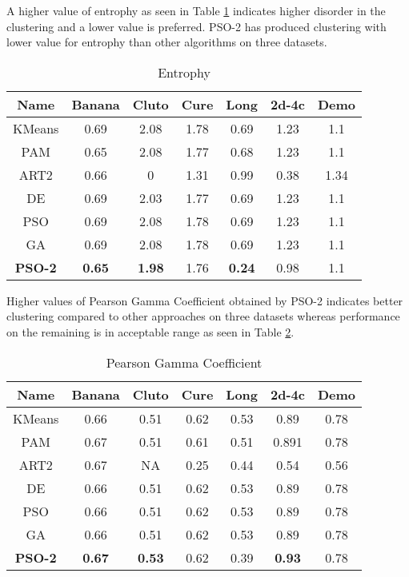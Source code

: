 \documentclass[conference]{IEEEtran}
\begin{document}
A higher value of entrophy as seen in Table \ref{ent} indicates higher disorder in the clustering and a lower value is preferred. PSO-2 has produced clustering with lower value for entrophy than other algorithms on three datasets.

\begin{table}[H]
\caption{Entrophy}
\label{ent}
\centering
\begin{tabular}{||c|c|c|c|c|c|c||}
  \hline
\multicolumn{1}{|c|}{\textbf{Name}} & \multicolumn{1}{c|}{\textbf{Banana}} & \multicolumn{1}{c|}{\textbf{Cluto}} & \multicolumn{1}{c|}{\textbf{Cure}} & \multicolumn{1}{c|}{\textbf{Long}} & \multicolumn{1}{c|}{\textbf{2d-4c}} & \multicolumn{1}{c|}{\textbf{Demo}}\\
  \hline\hline
  KMeans & 0.69 & 2.08 & 1.78 & 0.69 & 1.23 & 1.1 \\ [0.5ex]
   \hline
  PAM & 0.65 & 2.08 & 1.77 & 0.68 & 1.23 & 1.1 \\
   \hline
  ART2 & 0.66 & 0 & 1.31 & 0.99 & 0.38 & 1.34 \\
   \hline
  DE & 0.69 & 2.03 & 1.77 & 0.69 & 1.23 & 1.1 \\
   \hline
  PSO & 0.69 & 2.08 & 1.78 & 0.69 & 1.23 & 1.1 \\
   \hline
  GA & 0.69 & 2.08 & 1.78 & 0.69 & 1.23 & 1.1 \\
   \hline
  \textbf{PSO-2} & \textbf{0.65} & \textbf{1.98} & 1.76 & \textbf{0.24} & 0.98 & 1.1 \\  [1ex]
  \hline
\end{tabular}
\end{table}

Higher values of Pearson Gamma Coefficient obtained by PSO-2 indicates better clustering compared to other approaches on three datasets whereas performance on the remaining is in acceptable range as seen in Table \ref{pgc}.

\begin{table}[H]
\caption{Pearson Gamma Coefficient}
\label{pgc}
\centering
\begin{tabular}{||c|c|c|c|c|c|c||}
  \hline
\multicolumn{1}{|c|}{\textbf{Name}} & \multicolumn{1}{c|}{\textbf{Banana}} & \multicolumn{1}{c|}{\textbf{Cluto}} & \multicolumn{1}{c|}{\textbf{Cure}} & \multicolumn{1}{c|}{\textbf{Long}} & \multicolumn{1}{c|}{\textbf{2d-4c}} & \multicolumn{1}{c|}{\textbf{Demo}}\\
  \hline\hline
  KMeans & 0.66 & 0.51 & 0.62 & 0.53 & 0.89 & 0.78 \\ [0.5ex]
   \hline
  PAM & 0.67 & 0.51 & 0.61 & 0.51 & 0.891 & 0.78 \\
   \hline
  ART2 & 0.67 & NA & 0.25 & 0.44 & 0.54 & 0.56 \\
   \hline
  DE & 0.66 & 0.51 & 0.62 & 0.53 & 0.89 & 0.78 \\
   \hline
  PSO & 0.66 & 0.51 & 0.62 & 0.53 & 0.89 & 0.78 \\
   \hline
  GA & 0.66 & 0.51 & 0.62 & 0.53 & 0.89 &  0.78 \\
   \hline
  \textbf{PSO-2} & \textbf{0.67} & \textbf{0.53} & 0.62 & 0.39 & \textbf{0.93} & 0.78 \\  [1ex]
  \hline
\end{tabular}
\end{table}
\end{document}
